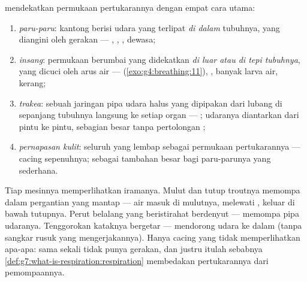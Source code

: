 \begin{definition}\label{def:g7:how-animals-breathe:four}
 mendekatkan permukaan pertukarannya dengan empat cara utama:
\begin{enumerate}
  \item \emph{paru-paru}: kantong berisi udara yang
        terlipat \emph{di dalam} tubuhnya, yang diangini oleh gerakan
         --- , , ,  dewasa;
  \item \emph{insang}: permukaan berumbai yang
        didekatkan \emph{di luar atau di tepi tubuhnya}, yang dicuci
        oleh arus air --- 
        (\cref{exo:g4:breathing:11}), , banyak larva air,
        kerang;
  \item \emph{trakea}: sebuah jaringan pipa
        udara halus yang dipipakan dari lubang di sepanjang tubuhnya
        langsung ke setiap organ --- ; udaranya diantarkan
        dari pintu ke pintu, sebagian besar tanpa pertolongan
        ;
  \item \emph{pernapasan kulit}: seluruh 
        yang lembap sebagai permukaan pertukarannya --- cacing 
        sepenuhnya;  sebagai tambahan besar bagi paru-parunya
        yang sederhana.
\end{enumerate}
\end{definition}

\begin{example}\label{ex:g7:how-animals-breathe:watch}
Tiap mesinnya memperlihatkan iramanya. Mulut dan tutup  
troutnya memompa dalam pergantian yang mantap --- air masuk di
mulutnya, melewati , keluar di bawah tutupnya. Perut belalang
yang beristirahat berdenyut --- memompa pipa udaranya. Tenggorokan
kataknya bergetar --- mendorong udara ke dalam  (tanpa
sangkar rusuk yang mengerjakannya). Hanya cacing  yang tidak
memperlihatkan apa-apa:  sama sekali tidak punya
gerakan, dan justru itulah sebabnya
\cref{def:g7:what-is-respiration:respiration} membedakan
pertukarannya dari pemompaannya.
\end{example}

